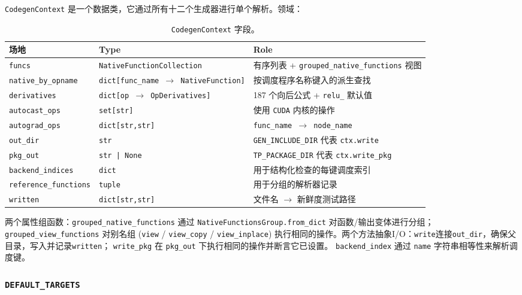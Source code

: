 \texttt{CodegenContext} 是一个数据类，它通过所有十二个生成器进行单个解析。领域：

\begin{table}[H]
\centering
\caption{\texttt{CodegenContext} 字段。}
\label{tab:codegencontext}
\small
\begin{tabular}{lll}
\toprule
场地 & Type & Role \\
\midrule
\texttt{funcs} & \texttt{NativeFunctionCollection} & 有序列表 + \texttt{grouped\_native\_functions} 视图 \\
\texttt{native\_by\_opname} & \texttt{dict[func\_name $\rightarrow$ NativeFunction]} & 按调度程序名称键入的派生查找 \\
\texttt{derivatives} & \texttt{dict[op $\rightarrow$ OpDerivatives]} & 187 个向后公式 + \texttt{relu\_} 默认值 \\
\texttt{autocast\_ops} & \texttt{set[str]} & 使用 \texttt{CUDA} 内核的操作 \\
\texttt{autograd\_ops} & \texttt{dict[str,str]} & \texttt{func\_name $\rightarrow$ node\_name} \\
\texttt{out\_dir} & \texttt{str} & \texttt{GEN\_INCLUDE\_DIR} 代表 \texttt{ctx.write} \\
\texttt{pkg\_out} & \texttt{str | None} & \texttt{TP\_PACKAGE\_DIR} 代表 \texttt{ctx.write\_pkg} \\
\texttt{backend\_indices} & \texttt{dict} & 用于结构化检查的每键调度索引 \\
\texttt{reference\_functions} & \texttt{tuple} & 用于分组的解析器记录 \\
\texttt{written} & \texttt{dict[str,str]} & 文件名 $\rightarrow$ 新鲜度测试路径 \\
\bottomrule
\end{tabular}
\end{table}

两个属性组函数：\texttt{grouped\_native\_functions} 通过 \texttt{NativeFunctionsGroup.from\_dict} 对函数/输出变体进行分组； \texttt{grouped\_view\_functions} 对别名组 (\texttt{view} / \texttt{view\_copy} / \texttt{view\_inplace}) 执行相同的操作。两个方法抽象I/O：\texttt{write}连接\texttt{out\_dir}，确保父目录，写入并记录\texttt{written}； \texttt{write\_pkg} 在 \texttt{pkg\_out} 下执行相同的操作并断言它已设置。 \texttt{backend\_index} 通过 \texttt{name} 字符串相等性来解析调度键。

\subsubsection{ \texttt{DEFAULT\_TARGETS}}

